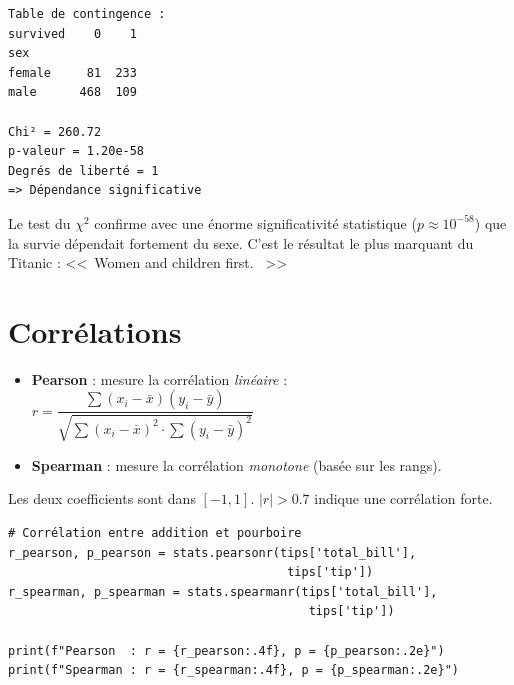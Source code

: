 \begin{codeoutput}
\begin{verbatim}
Table de contingence :
survived    0    1
sex
female     81  233
male      468  109

Chi² = 260.72
p-valeur = 1.20e-58
Degrés de liberté = 1
=> Dépendance significative
\end{verbatim}
\end{codeoutput}

\begin{remarque}
Le test du $\chi^2$ confirme avec une \'enorme significativit\'e statistique ($p \approx 10^{-58}$) que la survie d\'ependait fortement du sexe. C'est le r\'esultat le plus marquant du Titanic : <<~Women and children first. ~>>
\end{remarque}

\section{Corr\'elations}

\begin{definition}
\begin{itemize}
    \item \textbf{Pearson} : mesure la corr\'elation \emph{lin\'eaire} :
    $r = \dfrac{\sum(x_i - \bar{x})(y_i - \bar{y})}{\sqrt{\sum(x_i - \bar{x})^2 \cdot \sum(y_i - \bar{y})^2}}$
    \item \textbf{Spearman} : mesure la corr\'elation \emph{monotone} (bas\'ee sur les rangs).
\end{itemize}
Les deux coefficients sont dans $[-1, 1]$. $|r| > 0.7$ indique une corr\'elation forte.
\end{definition}

\begin{codeblock}[title=\textbf{Python}]
\begin{verbatim}
# Corrélation entre addition et pourboire
r_pearson, p_pearson = stats.pearsonr(tips['total_bill'],
                                       tips['tip'])
r_spearman, p_spearman = stats.spearmanr(tips['total_bill'],
                                          tips['tip'])

print(f"Pearson  : r = {r_pearson:.4f}, p = {p_pearson:.2e}")
print(f"Spearman : r = {r_spearman:.4f}, p = {p_spearman:.2e}")
\end{verbatim}
\end{codeblock}

